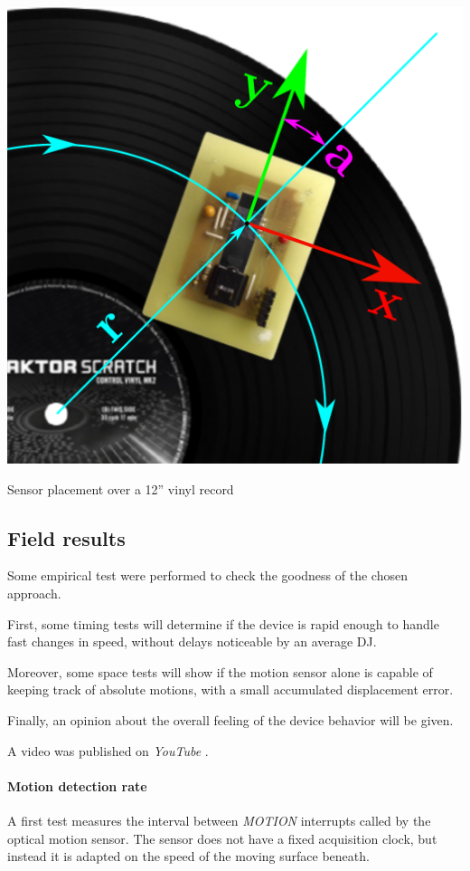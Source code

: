 \documentclass[a4paper,10pt]{article}
\makeatletter
\newenvironment{figurehere}{\def\@captype{figure}\vspace{2ex}}{\vspace{2ex}}
\makeatother
\begin{document}
\begin{multicols}{2}
\begin{figurehere}
	\centering
	\includegraphics[keepaspectratio=true,width=0.6\columnwidth]{images/ratt_placement.pdf}
	\caption{Sensor placement over a 12'' vinyl record}
	\label{fig:ratt_placement}
\end{figurehere}


\subsection{Field results}

Some empirical test were performed to check the goodness of the chosen
approach.

First, some timing tests will determine if the device is rapid enough to
handle fast changes in speed, without delays noticeable by an average DJ.

Moreover, some space tests will show if the motion sensor alone is capable
of keeping track of absolute motions, with a small accumulated displacement
error.

Finally, an opinion about the overall feeling of the device behavior will be
given.

A video was published on \emph{YouTube} \cite{youtube_ratt}.


\paragraph{Motion detection rate}
A first test measures the interval between \emph{MOTION} interrupts called by
the optical motion sensor. The sensor does not have a fixed acquisition clock,
but instead it is adapted on the speed of the moving surface beneath.


\end{multicols}
\end{document}
